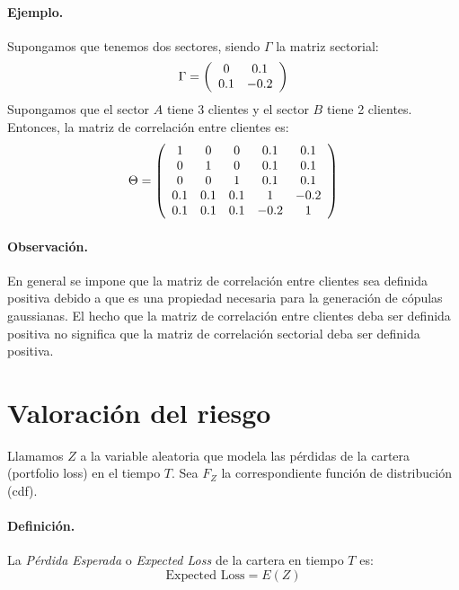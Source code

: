 \paragraph{Ejemplo.}Supongamos que tenemos dos sectores, siendo $\Gamma$ la
matriz sectorial:
\begin{displaymath}
\Gamma=\left(
\begin{array}{cc}
 0  &  0.1 \cr
0.1 & -0.2
\end{array}
\right)
\end{displaymath}
Supongamos que el sector $A$ tiene 3 clientes y el sector $B$ tiene 2 clientes.
Entonces, la matriz de correlaci\'on entre clientes es:
\begin{displaymath}
\Theta = \left(
\begin{array}{ccccc}
  1  &  0  &  0    &  0.1 &  0.1 \cr
  0  &  1  &  0    &  0.1 &  0.1 \cr
  0  &  0  &  1    &  0.1 &  0.1 \cr
 0.1 & 0.1 &  0.1  &  1   & -0.2 \cr
 0.1 & 0.1 &  0.1  & -0.2 &  1
\end{array}
\right)
\end{displaymath}


\paragraph{Observaci\'on.}  En general se impone
que la matriz de correlaci\'on entre clientes sea definida positiva
debido a que es una propiedad necesaria para la generaci\'on de c\'opulas
gaussianas. El hecho que la matriz de correlaci\'on entre clientes deba ser
definida positiva no significa que la matriz de correlaci\'on sectorial
deba ser definida positiva.


\section{Valoraci\'on del riesgo}

Llamamos $Z$ a la variable aleatoria que modela las p\'erdidas de la cartera
(portfolio loss) en el tiempo $T$. Sea $F_Z$ la correspondiente funci\'on de
distribuci\'on (cdf).

\paragraph{Definici\'on.} La \emph{P\'erdida Esperada} o \emph{Expected Loss}
 de la cartera en tiempo $T$ es:
\begin{equation}
\textrm{Expected Loss} = E(Z)
\end{equation}

